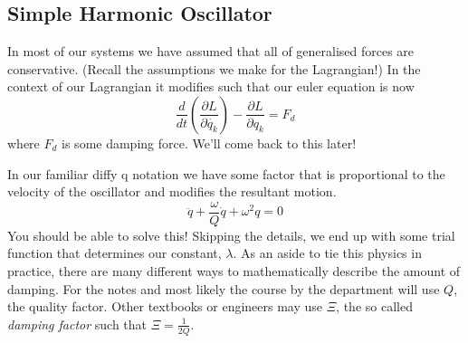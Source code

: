 \subsection{Simple Harmonic Oscillator}
In most of our systems we have assumed that all of generalised forces are conservative. (Recall the assumptions we make for the Lagrangian!) In the context of our Lagrangian it modifies such that our euler equation is now
\begin{equation}
 \frac{d}{dt} (\frac{\partial L}{\partial \dot{q_{k}}}) - \frac{\partial L}{\partial q_{k}} = F_{d}
\end{equation}
where $F_{d}$ is some damping force. We'll come back to this later! \par In our familiar diffy q notation we have some factor that is proportional to the velocity of the oscillator and modifies the resultant motion. 
\begin{equation}
\ddot{q} + \frac{\omega}{Q}\dot{q} + \omega^{2}q = 0
\end{equation}
You should be able to solve this! Skipping the details, we end up with some trial function that determines our constant, $\lambda$. As an aside to tie this physics in practice, there are many different ways to mathematically describe the amount of damping. For the notes and most likely the course by the department will use $Q$, the quality factor. Other textbooks or engineers may use $\Xi$, the so called \textit{damping factor} such that
\begin{math}
\Xi = \frac{1}{2Q}
\end{math}.

